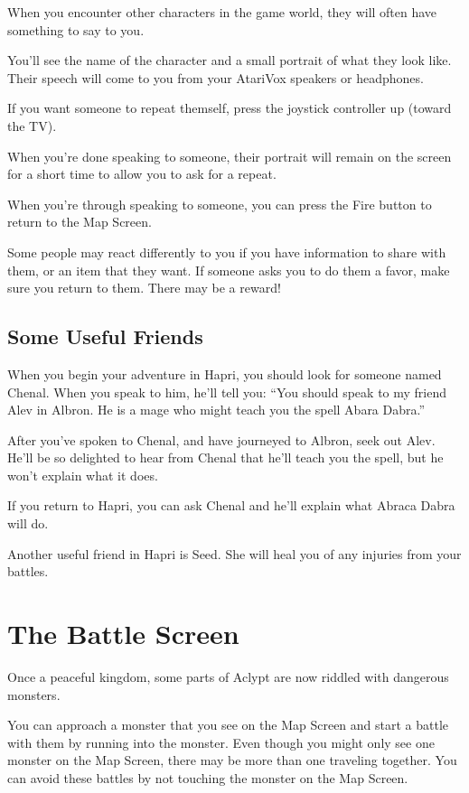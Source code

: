 \documentclass[10pt,twoside,openright]{memoir}
\begin{document}
When you encounter other characters in the game world, they will often
have something to say to you.

You'll see the name of the character and a small portrait of what they
look like. Their speech will come to you from your AtariVox speakers
or headphones.

If you want someone to repeat themself, press the joystick controller
up (toward the TV).

When you're  done speaking to  someone, their portrait will  remain on
the screen for a short time to allow you to ask for a repeat.

When you're through speaking to someone, you can press the Fire button
to return to the Map Screen.

Some people  may react differently to  you if you have  information to
share with them, or an item that  they want. If someone asks you to do
them a favor, make sure you return to them. There may be a reward!

\subsection{Some Useful Friends}

When you begin your adventure in Hapri, you should look for someone
named Chenal. When you speak to him, he'll tell you: ``You should
speak to my friend Alev in Albron. He is a mage who might teach you
the spell Abara Dabra.''

After you've spoken to Chenal, and have journeyed to Albron, seek out
Alev. He'll be so delighted to hear from Chenal that he'll teach you
the spell, but he won't explain what it does.

If you return to Hapri, you can ask Chenal and he'll explain what
Abraca Dabra will do.

Another useful friend in Hapri is Seed. She will heal you of any
injuries from your battles.

\section{The Battle Screen}

Once a peaceful kingdom, some parts of Aclypt are now riddled with
dangerous monsters.

You can approach a monster that you see on the Map Screen and start a
battle with them by running into the monster. Even though you might
only see one monster on the Map Screen, there may be more than one
traveling together. You can avoid these battles by not touching the
monster on the Map Screen.
\end{document}
